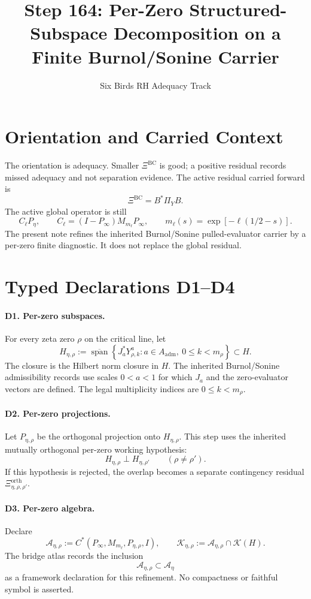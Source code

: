 \documentclass[11pt]{article}
\title{Step 164: Per-Zero Structured-Subspace Decomposition on a Finite Burnol/Sonine Carrier}
\author{Six Birds RH Adequacy Track}
\date{}
\newcommand{\cA}{\mathcal A}
\newcommand{\cK}{\mathcal K}
\newcommand{\Hetarho}{H_{\eta,\rho}}
\newcommand{\Peta}{P_{\eta}}
\newcommand{\Petarho}{P_{\eta,\rho}}
\newcommand{\Cell}{C_{\ell}}
\begin{document}
\maketitle

\section*{Orientation and Carried Context}

The orientation is adequacy. Smaller \(\Xi^{\mathrm{BC}}\) is good; a
positive residual records missed adequacy and not separation evidence.
The active residual carried forward is
\[
  \Xi^{\mathrm{BC}} = B^*\Pi_YB.
\]
The active global operator is still
\[
  \Cell \Peta,\qquad
  \Cell=(I-P_\infty)M_{m_\ell}P_\infty,\qquad
  m_\ell(s)=\exp[-\ell(1/2-s)].
\]
The present note refines the inherited Burnol/Sonine pulled-evaluator carrier
by a per-zero finite diagnostic. It does not replace the global residual.

\section*{Typed Declarations D1--D4}

\paragraph{D1. Per-zero subspaces.}
For every zeta zero \(\rho\) on the critical line, let
\[
  \Hetarho
  :=
  \overline{\operatorname{span}}
  \left\{
    J_a^*Y^a_{\rho,k}
    :
    a\in A_{\mathrm{adm}},\ 0\leq k<m_\rho
  \right\}
  \subset H.
\]
The closure is the Hilbert norm closure in \(H\). The inherited
Burnol/Sonine admissibility records use scales \(0<a<1\) for which \(J_a\)
and the zero-evaluator vectors are defined. The legal multiplicity indices
are \(0\leq k<m_\rho\).

\paragraph{D2. Per-zero projections.}
Let \(\Petarho\) be the orthogonal projection onto \(\Hetarho\).
This step uses the inherited mutually orthogonal per-zero working hypothesis:
\[
  \Hetarho\perp H_{\eta,\rho'}\qquad(\rho\neq\rho').
\]
If this hypothesis is rejected, the overlap becomes a separate contingency
residual \(\Xi^{\mathrm{orth}}_{\eta,\rho,\rho'}\).

\paragraph{D3. Per-zero algebra.}
Declare
\[
  \cA_{\eta,\rho}
  :=
  C^*(P_\infty,M_{m_\ell},\Petarho,I),
  \qquad
  \cK_{\eta,\rho}
  :=
  \cA_{\eta,\rho}\cap\cK(H).
\]
The bridge atlas records the inclusion
\[
  \cA_{\eta,\rho}\subset \cA_\eta
\]
as a framework declaration for this refinement. No compactness or faithful
symbol is asserted.
\end{document}
